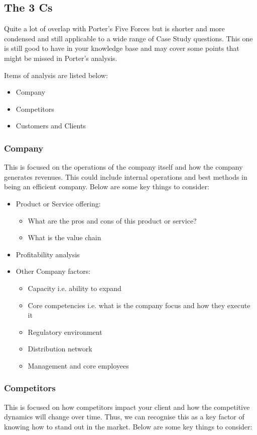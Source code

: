 \documentclass[a4paper]{article}
\begin{document}
{\subsection{The 3 Cs}
Quite a lot of overlap with Porter's Five Forces but is shorter and more condensed and still applicable to a wide range of Case Study questions. This one is still good to have in your knowledge base and may cover some points that might be missed in Porter's analysis.

\vspace{5pt}
\noindent Items of analysis are listed below:
\begin{itemize}
	\item Company
	\item Competitors
	\item Customers and Clients
\end{itemize}

\subsubsection{Company}
This is focused on the operations of the company itself and how the company generates revenues. This could include internal operations and best methods in being an efficient company. Below are some key things to consider:

\begin{itemize}
	\item Product or Service offering:
		\begin{itemize} 
			\item What are the pros and cons of this product or service?
			\item What is the value chain
		\end{itemize}
	\item Profitability analysis
	\item Other Company factors:
		\begin{itemize}
			\item Capacity i.e. ability to expand
			\item Core competencies i.e. what is the company focus and how they execute it
			\item Regulatory environment
			\item Distribution network
			\item Management and core employees
		\end{itemize}
\end{itemize}

\subsubsection{Competitors}
This is focused on how competitors impact your client and how the competitive dynamics will change over time. Thus, we can recognise this as a key factor of knowing how to stand out in the market. Below are some key things to consider:

}
\end{document}
